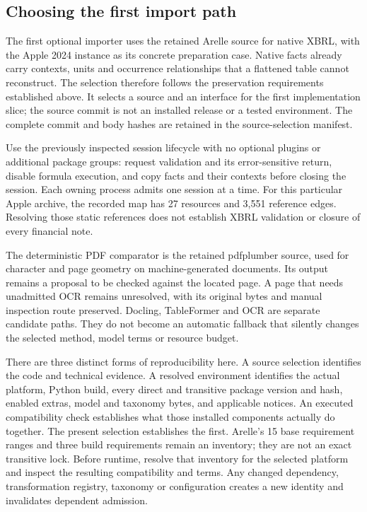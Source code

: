 \hypertarget{choosing-the-first-import-path}{%
\subsection{Choosing the first import path}\label{choosing-the-first-import-path}}

The first optional importer uses the retained Arelle source \citep{arellepinned2026} for native XBRL, with the Apple 2024 instance as its concrete preparation case. Native facts already carry contexts, units and occurrence relationships that a flattened table cannot reconstruct. The selection therefore follows the preservation requirements established above. It selects a source and an interface for the first implementation slice; the source commit is not an installed release or a tested environment. The complete commit and body hashes are retained in the source-selection manifest.

Use the previously inspected session lifecycle with no optional plugins or additional package groups: request validation and its error-sensitive return, disable formula execution, and copy facts and their contexts before closing the session. Each owning process admits one session at a time. For this particular Apple archive, the recorded map has 27 resources and 3,551 reference edges. Resolving those static references does not establish XBRL validation or closure of every financial note.

The deterministic PDF comparator is the retained pdfplumber source, used for character and page geometry on machine-generated documents. Its output remains a proposal to be checked against the located page. A page that needs unadmitted OCR remains unresolved, with its original bytes and manual inspection route preserved. Docling, TableFormer and OCR are separate candidate paths. They do not become an automatic fallback that silently changes the selected method, model terms or resource budget.

There are three distinct forms of reproducibility here. A source selection identifies the code and technical evidence. A resolved environment identifies the actual platform, Python build, every direct and transitive package version and hash, enabled extras, model and taxonomy bytes, and applicable notices. An executed compatibility check establishes what those installed components actually do together. The present selection establishes the first. Arelle's 15 base requirement ranges and three build requirements remain an inventory; they are not an exact transitive lock. Before runtime, resolve that inventory for the selected platform and inspect the resulting compatibility and terms. Any changed dependency, transformation registry, taxonomy or configuration creates a new identity and invalidates dependent admission.

